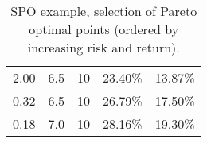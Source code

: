 \documentclass[openany]{article}  %
\begin{document}
\begin{table}
\begin{center}
\begin{tabular}{rrl|ll}
    2.00 &                      6.5 &                     10 &  23.40\% &  13.87\% \\
    0.32 &                      6.5 &                     10 &  26.79\% &  17.50\% \\
    0.18 &                      7.0 &                     10 &  28.16\% &  19.30\% \\
\bottomrule
\end{tabular}
\end{center}
\caption{SPO example, selection of Pareto optimal points (ordered by increasing risk and return).}
\label{tab:spo_pareto}
\end{table}
\end{document}
